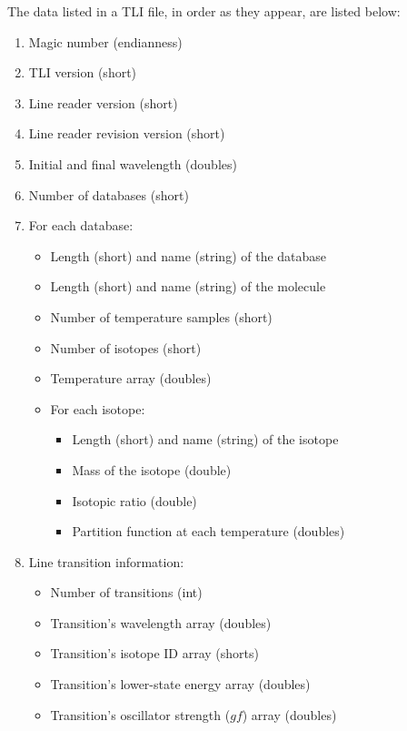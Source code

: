 \documentclass[letterpaper, 12pt]{article}
\begin{document}
The data listed in a TLI file, in order as they appear, are listed below:

\begin{enumerate}
\setlength\itemsep{0ex}
\setlength\topsep{0ex}
\setlength\partopsep{0ex}
\setlength\parsep{0ex}

\item Magic number (endianness)
\item TLI version (short)
\item Line reader version (short)
\item Line reader revision version (short)
\item Initial and final wavelength (doubles)
\item Number of databases (short)
\item For each database:

\begin{itemize}
\setlength\itemsep{0ex}
\setlength\topsep{0ex}
\setlength\partopsep{0ex}
\setlength\parsep{0ex}
\item Length (short) and name (string) of the database
\item Length (short) and name (string) of the molecule
\item Number of temperature samples (short)
\item Number of isotopes (short)
\item Temperature array (doubles)

\item For each isotope:
\begin{itemize}
\setlength\itemsep{0ex}
\setlength\topsep{0ex}
\setlength\partopsep{0ex}
\setlength\parsep{0ex}
\item Length (short) and name (string) of the isotope
\item Mass of the isotope (double)
\item Isotopic ratio (double)
\item Partition function at each temperature (doubles)
\end{itemize}

\end{itemize}

\item Line transition information:
\begin{itemize}
\setlength\itemsep{0ex}
\setlength\topsep{0ex}
\setlength\partopsep{0ex}
\setlength\parsep{0ex}
\item Number of transitions (int)
\item Transition's wavelength array (doubles)
\item Transition's isotope ID array (shorts) 
\item Transition's lower-state energy array (doubles)
\item Transition's oscillator strength ($gf$) array (doubles)
\end{itemize}
\end{enumerate}
\end{document}
